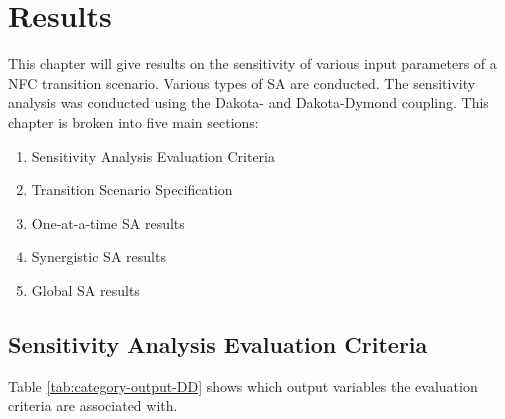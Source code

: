 \chapter{Results}
This chapter will give results on the sensitivity of various 
input parameters of a \gls{NFC} transition scenario. 
Various types of \gls{SA} are conducted. 
The sensitivity analysis was conducted using the Dakota-\Cyclus
and Dakota-Dymond coupling. 
This chapter is broken into five main sections: 
\begin{enumerate}
    \item Sensitivity Analysis Evaluation Criteria 
    \item Transition Scenario Specification 
    \item One-at-a-time \gls{SA} results 
    \item Synergistic \gls{SA} results
    \item Global \gls{SA} results 
\end{enumerate}


\section{Sensitivity Analysis Evaluation Criteria}
Table \ref{tab:category-output-DD} shows which output variables 
the evaluation criteria are associated with. 

